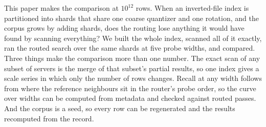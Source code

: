 \documentclass[sigconf, nonacm]{acmart}
\begin{document}
This paper makes the comparison at $10^{12}$ rows. When an inverted-file index is partitioned
into shards that share one coarse quantizer and one rotation, and the corpus grows by adding
shards, does the routing lose anything it would have found by scanning everything? We built the
whole index, scanned all of it exactly, ran the routed search over the same shards at five probe
widths, and compared. Three things make the comparison more than one number. The exact scan of any
subset of servers is the merge of that subset's partial results, so one index gives a scale series
in which only the number of rows changes. Recall at any width follows from where the reference
neighbours sit in the router's probe order, so the curve over widths can be computed from metadata
and checked against routed passes. And the corpus is a seed, so every row can be regenerated and
the results recomputed from the record.
\end{document}
